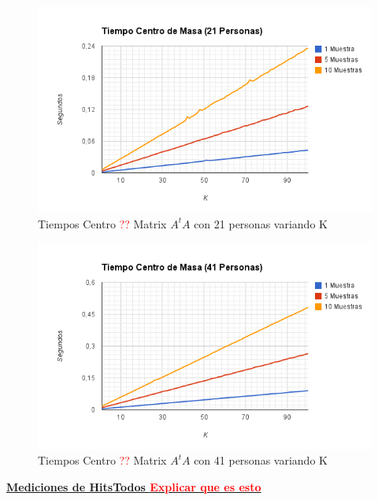 \begin{figure}[H]
\includegraphics[width=1\textwidth]{img/image8.png}
     \caption{Tiempos Centro \textcolor{red}{??} Matrix $A^tA$ con 21 personas variando K}
     \label{fig:figura1}
\end{figure}

\begin{figure}[H]
\includegraphics[width=1\textwidth]{img/image9.png}
     \caption{Tiempos Centro \textcolor{red}{??} Matrix $A^tA$ con 41 personas variando K}
     \label{fig:figura1}
\end{figure}



\underline{\textbf{Mediciones de HitsTodos \textcolor{red}{Explicar que es esto}}}

